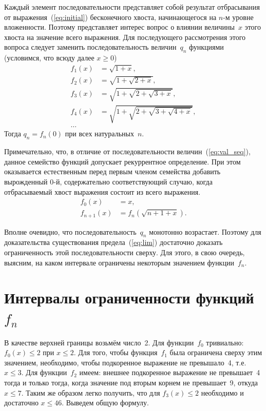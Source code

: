 \documentclass[12pt]{article}
\begin{document}
Каждый элемент последовательности представляет собой результат отбрасывания от выражения~(\ref{eq:initial}) бесконечного хвоста, начинающегося на \(n\)-м уровне
вложенности. Поэтому представляет интерес вопрос о влиянии величины~\(x\) этого хвоста на значение всего выражения. Для последующего рассмотрения этого вопроса
следует заменить последовательность величин~\(q_n\) функциями (условимся, что всюду далее \(x \geqslant 0\))
\begin{equation} \label{eq:func_seq}
\begin{aligned}
    f_1(x) & = \sqrt{1 + x}, \\
    f_2(x) & = \sqrt{1 + \sqrt{2 + x}}, \\
    f_3(x) & = \sqrt{1 + \sqrt{2 + \sqrt{3 + x}}}, \\
    f_4(x) & = \sqrt{1 + \sqrt{2 + \sqrt{3 + \sqrt{4 + x}}}}, \\
    \ldots
\end{aligned}
\end{equation}
Тогда \(q_n = f_n(0)\) при всех натуральных~\(n\).

Примечательно, что, в отличие от последовательности величин~(\ref{eq:val_seq}), данное семейство функций допускает рекуррентное определение. При этом
оказывается естественным перед первым членом семейства добавить вырожденный 0-й, содержательно соответствующий случаю, когда отбрасываемый хвост выражения
состоит из всего выражения.
\begin{align}
    f_0(x) & = x, \label{eq:func_recur_base} \\
    f_{n+1}(x) & = f_n(\sqrt{n + 1 + x}). \label{eq:func_recur_step}
\end{align}

Вполне очевидно, что последовательность~\(q_n\) монотонно возрастает. Поэтому для доказательства существования предела~(\ref{eq:lim}) достаточно доказать
ограниченность этой последовательности сверху. Для этого, в свою очередь, выясним, на каком интервале ограничены некоторым значением функции~$f_n$.

\section{Интервалы ограниченности функций~\(f_n\)}

В качестве верхней границы возьмём число~2. Для функции~\(f_0\) тривиально: \(f_0(x) \leqslant 2\) при \(x \leqslant 2\).
Для того, чтобы функция~\(f_1\) была ограничена сверху этим значением, необходимо, чтобы подкоренное выражение не превышало~4, т.е. \(x \leqslant 3\). Для
функции~\(f_2\) имеем: внешнее подкоренное выражение не превышает~4 тогда и только тогда, когда значение под вторым корнем не превышает~9, откуда \(x \leqslant 7\).
Таким же образом легко получить, что для \(f_3(x) \leqslant 2\) необходимо и достаточно \(x \leqslant 46\). Выведем общую формулу.
\end{document}
